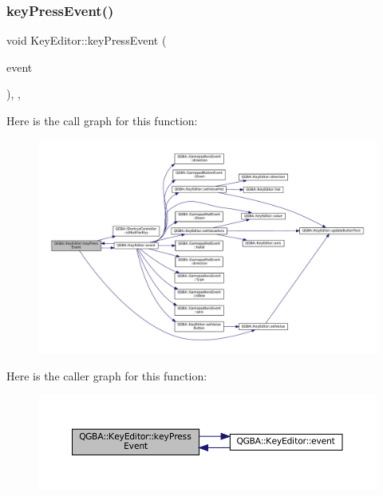 \subsubsection{\texorpdfstring{key\+Press\+Event()}{keyPressEvent()}}
{\footnotesize\ttfamily void Key\+Editor\+::key\+Press\+Event (\begin{DoxyParamCaption}\item[{Q\+Key\+Event $\ast$}]{event }\end{DoxyParamCaption})\hspace{0.3cm}{\ttfamily [override]}, {\ttfamily [protected]}, {\ttfamily [virtual]}}

Here is the call graph for this function\+:
\nopagebreak
\begin{figure}[H]
\begin{center}
\leavevmode
\includegraphics[width=350pt]{class_q_g_b_a_1_1_key_editor_a3caf519db651b7658f6c3d589a7ed482_cgraph}
\end{center}
\end{figure}
Here is the caller graph for this function\+:
\nopagebreak
\begin{figure}[H]
\begin{center}
\leavevmode
\includegraphics[width=350pt]{class_q_g_b_a_1_1_key_editor_a3caf519db651b7658f6c3d589a7ed482_icgraph}
\end{center}
\end{figure}
\mbox{\label{class_q_g_b_a_1_1_key_editor_af9e4f2efe7c3edb632a31135b413c73b}} 
